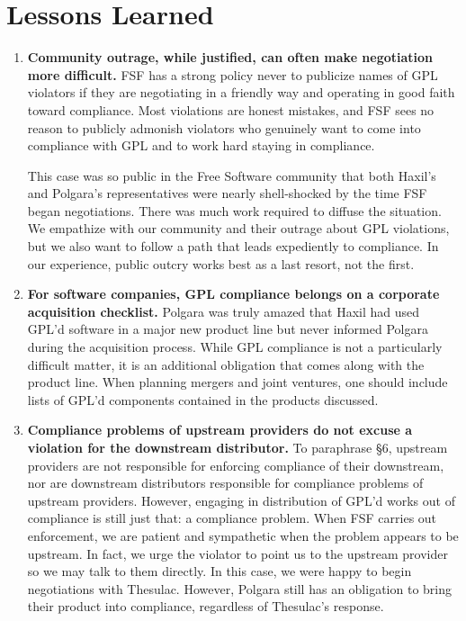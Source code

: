 {\section{Lessons Learned}

\begin{enumerate}

\item {\bf Community outrage, while justified, can often make negotiation
  more difficult.}  FSF has a strong policy never to publicize names of
  GPL violators if they are negotiating in a friendly way and operating in
  good faith toward compliance. Most violations are honest mistakes, and
  FSF sees no reason to publicly admonish violators who genuinely want to
  come into compliance with GPL and to work hard staying in compliance.

  This case was so public in the Free Software community that both Haxil's
  and Polgara's representatives were nearly shell-shocked by the time FSF
  began negotiations. There was much work required to diffuse the
  situation. We empathize with our community and their outrage about GPL
  violations, but we also want to follow a path that leads expediently
  to compliance. In our experience, public outcry works best as a last
  resort, not the first.

\item {\bf For software companies, GPL compliance belongs on a corporate
  acquisition checklist. }  Polgara was truly amazed that Haxil had used
  GPL'd software in a major new product line but never informed Polgara
  during the acquisition process. While GPL compliance is not a
  particularly difficult matter, it is an additional obligation that comes
  along with the product line. When planning mergers and joint ventures,
  one should include lists of GPL'd components contained in the products
  discussed.

\item {\bf Compliance problems of upstream providers do not excuse a
  violation for the downstream distributor.}  To paraphrase \S 6, upstream
  providers are not responsible for enforcing compliance of their
  downstream, nor are downstream distributors responsible for compliance
  problems of upstream providers. However, engaging in distribution of
  GPL'd works out of compliance is still just that: a compliance problem.
  When FSF carries out enforcement, we are patient and sympathetic when
  the problem appears to be upstream. In fact, we urge the violator to
  point us to the upstream provider so we may talk to them directly. In
  this case, we were happy to begin negotiations with Thesulac. However,
  Polgara still has an obligation to bring their product into compliance,
  regardless of Thesulac's response.


\end{enumerate}}
